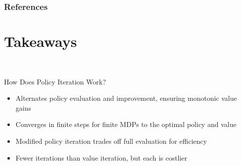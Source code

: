 \documentclass[11pt,table]{beamer}
\begin{document}
\begin{frame}[t,allowframebreaks
]%
\frametitle{References}
\small

\end{frame}
\section{Takeaways}
{
\begin{frame}
\centering
\Huge
\textcolor{white}{Takeaways}
\thispagestyle{empty}
\end{frame}
}

\begin{frame}{How Does Policy Iteration Work?}
\begin{itemize}
  \item Alternates policy evaluation and improvement, ensuring monotonic value gains
  \item Converges in finite steps for finite MDPs to the optimal policy and value
  \item Modified policy iteration trades off full evaluation for efficiency
  \item Fewer iterations than value iteration, but each is costlier
\end{itemize}
\end{frame}
\end{document}
